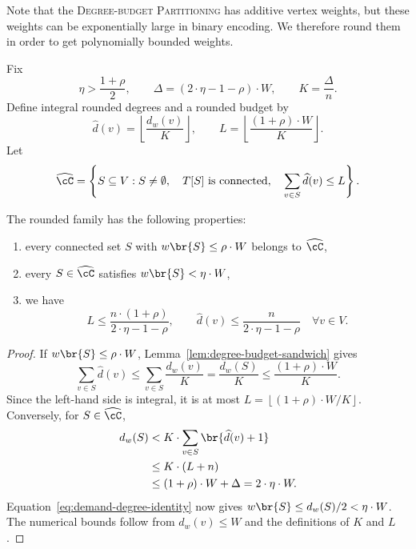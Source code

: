 Note that the \textsc{Degree-budget Partitioning} has additive vertex weights, but these weights can be exponentially large in binary encoding. We therefore round them in order to get polynomially bounded weights.

Fix
\[
    \eta>\frac{1+\rho}{2},
    \qquad
    \Delta=(2\cdot\eta-1-\rho)\cdot W,
    \qquad
    K=\frac{\Delta}{n}.
\]
Define integral rounded degrees and a rounded budget by
\begin{equation}\label{eq:rounded-degree-definition}
    \widehat d(v)=\left\lfloor\frac{d_w(v)}{K}\right\rfloor,
    \qquad
    L=\left\lfloor\frac{(1+\rho)\cdot W}{K}\right\rfloor.
\end{equation}
Let
\[
    \widehat\cC
    =\left\{
        S\subseteq V:
        S\neq\emptyset,\quad
        T[S]\text{ is connected},\quad
        \sum_{v\in S}\widehat d(v)\leq L
    \right\}.
\]

\begin{lemma}\label{lem:rounded-degree-family}
    The rounded family has the following properties:
    \begin{enumerate}
        \item every connected set $S$ with $w\br{S}\leq\rho \cdot W$ belongs to $\widehat\cC$,
        \item every $S\in\widehat\cC$ satisfies $w\br{S}<\eta \cdot W$,
        \item we have
        \[
            L\leq\frac{n\cdot(1+\rho)}{2\cdot\eta-1-\rho},
            \qquad
            \widehat d(v)\leq\frac{n}{2\cdot\eta-1-\rho}
            \quad\forall v\in V.
        \]
    \end{enumerate}
\end{lemma}
\begin{proof}
    If $w\br{S}\leq\rho \cdot W$, Lemma~\ref{lem:degree-budget-sandwich} gives
    \[
        \sum_{v\in S}\widehat d(v)
        \leq\sum_{v\in S}\frac{d_w(v)}{K}
        =\frac{d_w(S)}{K}
        \leq\frac{(1+\rho)\cdot W}{K}.
    \]
    Since the left-hand side is integral, it is at most $L=\left\lfloor(1+\rho)\cdot W/K\right\rfloor$.
    Conversely, for $S\in\widehat\cC$,
    \begin{align*}
        d_w(S)
        &<K\cdot \sum_{v\in S}\br{\widehat d(v)+1}\\
        &\leq K\cdot (L+n)\\
        &\leq(1+\rho)\cdot W+\Delta
        =2\cdot\eta \cdot W.
    \end{align*}
    Equation~\eqref{eq:demand-degree-identity} now gives $w\br{S}\leq d_w(S)/2<\eta \cdot W$. The numerical bounds follow from $d_w(v)\leq W$ and the definitions of $K$ and $L$.
\end{proof}


